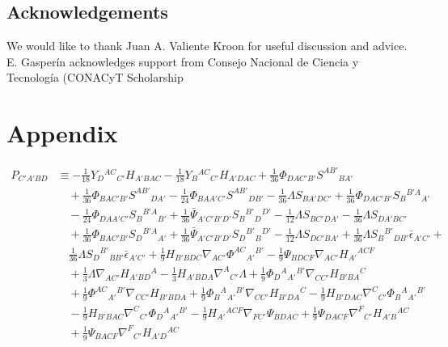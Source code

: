 \documentclass[10pt,a4paper]{article}
\theoremstyle{plain}
\begin{document}
\subsection*{Acknowledgements}

We would like to thank Juan A. Valiente Kroon for useful discussion
and advice. E. Gasper\'in acknowledges support from Consejo
Nacional de Ciencia y Tecnolog\'ia (CONACyT Scholarship

\section{Appendix}
\label{Appendix}
\begin{align} 
  P_{C'A'BD} &\equiv - \tfrac{1}{18} Y_{D}{}^{AC}{}_{C'} H_{A'BAC} -
  \tfrac{1}{18} Y_{B}{}^{AC}{}_{C'} H_{A'DAC} + \tfrac{1}{36}
  \Phi_{DAC'B'} S^{AB'}{}_{BA'} \nonumber \\ & \quad + \tfrac{1}{36}
  \Phi_{BAC'B'} S^{AB'}{}_{DA'} - \tfrac{1}{24} \Phi_{BAA'C'}
  S^{AB'}{}_{DB'} - \tfrac{1}{36} \Lambda S_{BA'DC'} + \tfrac{1}{36}
  \Phi_{DAC'B'} S_{B}{}^{B'A}{}_{A'}\nonumber \\ & \quad -
  \tfrac{1}{24} \Phi_{DAA'C'} S_{B}{}^{B'A}{}_{B'} + \tfrac{1}{36}
  \bar{\Psi}_{A'C'B'D'} S_{B}{}^{B'}{}_{D}{}^{D'} - \tfrac{1}{12}
  \Lambda S_{BC'DA'} - \tfrac{1}{36} \Lambda S_{DA'BC'} \nonumber \\ &
  \quad + \tfrac{1}{36} \Phi_{BAC'B'} S_{D}{}^{B'A}{}_{A'} +
  \tfrac{1}{36} \bar{\Psi}_{A'C'B'D'} S_{D}{}^{B'}{}_{B}{}^{D'} -
  \tfrac{1}{12} \Lambda S_{DC'BA'} + \tfrac{1}{36} \Lambda
  S_{B}{}^{B'}{}_{DB'} \bar{\epsilon}_{A'C'} +\nonumber \\ & \quad
  \tfrac{1}{36} \Lambda S_{D}{}^{B'}{}_{BB'} \bar{\epsilon}_{A'C'} +
  \tfrac{1}{9} H_{B'BDC} \nabla_{AC'}\Phi^{AC}{}_{A'}{}^{B'} -
  \tfrac{1}{9} \Psi_{BDCF} \nabla_{AC'}H_{A'}{}^{ACF} \nonumber \\ &
  \quad + \tfrac{1}{3} \Lambda \nabla_{AC'}H_{A'BD}{}^{A} -
  \tfrac{1}{3} H_{A'BDA} \nabla^{A}{}_{C'}\Lambda + \tfrac{1}{9}
  \Phi_{D}{}^{A}{}_{A'}{}^{B'} \nabla_{CC'}H_{B'BA}{}^{C}
  \nonumber\\ & \quad + \tfrac{1}{9} \Phi^{AC}{}_{A'}{}^{B'}
  \nabla_{CC'}H_{B'BDA} + \tfrac{1}{9} \Phi_{B}{}^{A}{}_{A'}{}^{B'}
  \nabla_{CC'}H_{B'DA}{}^{C} - \tfrac{1}{9} H_{B'DAC}
  \nabla^{C}{}_{C'}\Phi_{B}{}^{A}{}_{A'}{}^{B'} \nonumber\\ & \quad -
  \tfrac{1}{9} H_{B'BAC} \nabla^{C}{}_{C'}\Phi_{D}{}^{A}{}_{A'}{}^{B'}
  - \tfrac{1}{9} H_{A'}{}^{ACF} \nabla_{FC'}\Psi_{BDAC} + \tfrac{1}{9}
  \Psi_{DACF} \nabla^{F}{}_{C'}H_{A'B}{}^{AC} \nonumber\\ & \quad +
  \tfrac{1}{9} \Psi_{BACF} \nabla^{F}{}_{C'}H_{A'D}{}^{AC} \nonumber
\end{align}
\end{document}
